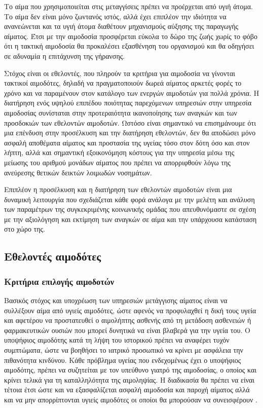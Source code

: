 	 Το αίμα που χρησιμοποιείται στις μεταγγίσεις πρέπει να προέρχεται από υγιή άτομα. Το αίμα δεν είναι μόνο ζωντανός ιστός, αλλά έχει επιπλέον την ιδιότητα να ανανεώνεται και τα υγιή άτομα διαθέτουν μηχανισμούς αύξησης της παραγωγής αίματος. Έτσι με την αιμοδοσία προσφέρεται εύκολα το δώρο της ζωής χωρίς το φόβο ότι η τακτική αιμοδοσία θα προκαλέσει εξασθένηση του οργανισμού και θα οδηγήσει σε αδυναμία η επιτάχυνση της γήρανσης.
	 
	Στόχος είναι οι εθελοντές, που πληρούν τα κριτήρια για αιμοδοσία να γίνονται τακτικοί αιμοδότες, δηλαδή να πραγματοποιούν δωρεά αίματος αρκετές φορές το χρόνο και να παραμένουν στον κατάλογο των ενεργών αιμοδοτών για πολλά χρόνια. Η διατήρηση ενός υψηλού επιπέδου ποιότητας παρεχόμενων υπηρεσιών στην υπηρεσία αιμοδοσίας συνίσταται στην προτεραιότητα ικανοποίησης των αναγκών και των προσδοκιών των εθελοντών αιμοδοτών. Ωστόσο είναι σημαντικό να επισημάνουμε ότι μια επένδυση στην προσέλκυση και την διατήρηση εθελοντών, δεν θα αποδώσει μόνο ασφαλή αποθέματα αίματος και προστασία της υγείας τόσο στον δότη όσο και στον λήπτη, αλλά και σημαντική εξοικονόμηση κόστους για την υπηρεσία μέσω της μείωσης του αριθμού μονάδων αίματος που πρέπει να απορριφθούν λόγω της ανεύρεσης θετικών δεικτών λοιμωδών νοσημάτων. 
	
	Επιπλέον η προσέλκυση και η διατήρηση των εθελοντών αιμοδοτών είναι μια δυναμική λειτουργία που σχεδιάζεται κάθε φορά ανάλογα με την μελέτη και ανάλυση των παραμέτρων της συγκεκριμένης κοινωνικής ομάδας που απευθυνόμαστε σε σχέση με την αξιολόγηση και εκτίμηση των αναγκών σε αίμα και την υπάρχουσα κατάσταση στο χώρο της.
	\subsection{Εθελοντές αιμοδότες}
		\subsubsection{Κριτήρια επιλογής αιμοδοτών} 
			Βασικός στόχος και υποχρέωση των υπηρεσιών μετάγγισης αίματος είναι να συλλέξουν αίμα από υγιείς αιμοδότες, ώστε αφενός να προφυλαχθεί η δική τους υγεία και αφετέρου να προστατευθεί ο αιμολήπτης ασθενής από τη μετάδοση ασθενειών ή φαρμακευτικών ουσιών που μπορεί δυνητικά να είναι βλαβερά για την υγεία του. Ο υποψήφιος αιμοδότης κατά τη λήψη του ιστορικού πρέπει να αναφέρει τυχόν συμπτώματα, ώστε να βοηθήσει το ιατρικό προσωπικό να κρίνει με ασφάλεια την πιθανότητα κινδύνου. Κάθε πρόβλημα υγείας που ενδεχομένως έχει ο υποψήφιος αιμοδότης, πρέπει να συζητείται με τον υπεύθυνο γιατρό της αιμοδοσίας, ο οποίος και κρίνει τελικά για τη καταλληλότητα της αιμοληψίας. Η διαδικασία θα πρέπει να είναι τέτοια έτσι ώστε και να εξασφαλίζεται ασφαλή αιμοδοσία και παροχή αίματος αλλά και να μην απορρίπτονται υγιείς αιμοδότες οι οποίοι θα μπορούσαν να συνεισφέρουν \cite{bloodDonorSelection}.
			
